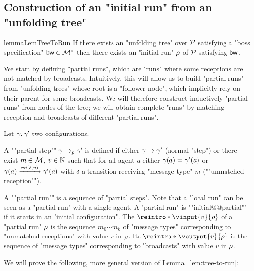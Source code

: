 \subsection{Construction of an "initial run" from an "unfolding tree"}
\label{app:tree-to-run}

\begin{restatable}{lemma}{LemTreeToRun}
	\label{lem:tree-to-run}
	If there exists an "unfolding tree" over $\mathcal{P}$ satisfying a "boss specification" $\mathsf{bw} \in \mathcal{M}^*$ then there exists an "initial run" $\rho$ of $\mathcal{P}$ satisfying $\mathsf{bw}$.
\end{restatable}

We start by defining "partial runs", which are "runs" where some receptions are not matched by broadcasts. Intuitively, this will allow us to build "partial runs" from "unfolding trees" whose root is a "follower node", which implicitly rely on their parent for some broadcasts. We will therefore construct inductively "partial runs" from nodes of the tree; we will obtain complete "runs" by matching reception and broadcasts of different "partial runs".

\begin{definition}
	Let $\gamma, \gamma'$ two configurations. 
	
	A ""partial step"" $\gamma \xrightarrow{}_{p} \gamma'$ is defined if either $\gamma \xrightarrow{} \gamma'$ (normal "step") or there exist $m \in \mathcal{M}$, $v\in \mathbb{N}$ such that for all agent $a$ either $\gamma(a) = \gamma'(a)$ or $\gamma(a) \xrightarrow{\mathsf{ext}(\delta,v)} \gamma'(a)$ with $\delta$ a transition receiving "message type" $m$ (""unmatched reception"").
	
	\AP A ""partial run"" is a sequence of "partial steps".
	Note that a "local run" can be seen as a "partial run" with a single agent. A "partial run" is ""initial@@partial"" if it starts in an "initial configuration".
	The  $\reintro*\vinput{v}{\run}$ of a "partial run" $\rho$ is the sequence $m_0 \cdots m_k$ of "message types" corresponding to "unmatched receptions" with value $v$ in $\rho$. Its  $\reintro*\voutput{v}{\run}$ is the sequence of "message types" corresponding to "broadcasts" with value $v$ in $\rho$.
\end{definition}


We will prove the following, more general version of Lemma~\ref{lem:tree-to-run}:

